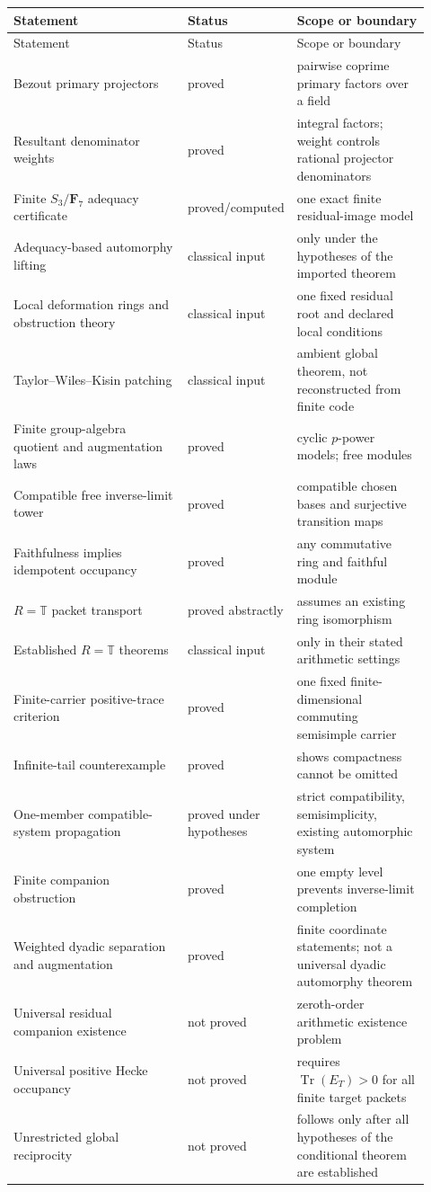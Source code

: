 \documentclass[11pt]{article}
\theoremstyle{definition}
\theoremstyle{remark}
\newcommand{\F}{\mathbf F}
\newcommand{\Tr}{\operatorname{Tr}}
\newcommand{\T}{\mathbb T}
\begin{document}
\begin{longtable}{p{0.42\linewidth}p{0.18\linewidth}p{0.32\linewidth}}
\toprule
Statement & Status & Scope or boundary\\
\midrule
\endfirsthead
\toprule
Statement & Status & Scope or boundary\\
\midrule
\endhead
Bezout primary projectors & proved & pairwise coprime primary factors over a field\\
Resultant denominator weights & proved & integral factors; weight controls rational projector denominators\\
Finite $S_3/\F_7$ adequacy certificate & proved/computed & one exact finite residual-image model\\
Adequacy-based automorphy lifting & classical input & only under the hypotheses of the imported theorem\\
Local deformation rings and obstruction theory & classical input & one fixed residual root and declared local conditions\\
Taylor--Wiles--Kisin patching & classical input & ambient global theorem, not reconstructed from finite code\\
Finite group-algebra quotient and augmentation laws & proved & cyclic $p$-power models; free modules\\
Compatible free inverse-limit tower & proved & compatible chosen bases and surjective transition maps\\
Faithfulness implies idempotent occupancy & proved & any commutative ring and faithful module\\
$R=\T$ packet transport & proved abstractly & assumes an existing ring isomorphism\\
Established $R=\T$ theorems & classical input & only in their stated arithmetic settings\\
Finite-carrier positive-trace criterion & proved & one fixed finite-dimensional commuting semisimple carrier\\
Infinite-tail counterexample & proved & shows compactness cannot be omitted\\
One-member compatible-system propagation & proved under hypotheses & strict compatibility, semisimplicity, existing automorphic system\\
Finite companion obstruction & proved & one empty level prevents inverse-limit completion\\
Weighted dyadic separation and augmentation & proved & finite coordinate statements; not a universal dyadic automorphy theorem\\
Universal residual companion existence & not proved & zeroth-order arithmetic existence problem\\
Universal positive Hecke occupancy & not proved & requires $\Tr(E_T)>0$ for all finite target packets\\
Unrestricted global reciprocity & not proved & follows only after all hypotheses of the conditional theorem are established\\
\bottomrule
\end{longtable}
\end{document}

